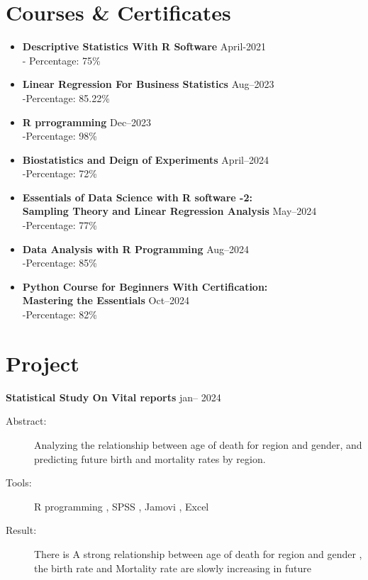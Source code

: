 \documentclass[a4paper,11pt]{article}
\begin{document}
	\section*{Courses \& Certificates}
	\noindent
	\begin{itemize}
		\item \textbf{Descriptive Statistics With R Software } \hfill April-2021\\
		- Percentage: 75\%
		\item \textbf{Linear Regression For Business Statistics} \hfill Aug--2023\\
		-Percentage: 85.22\%
		\item \textbf{R prrogramming } \hfill Dec--2023\\
		-Percentage: 98\%
		\item \textbf{Biostatistics and Deign of Experiments} \hfill April--2024 \\
		-Percentage: 72\%
		\item \textbf{Essentials of Data Science with R software -2:\\
			Sampling Theory and Linear Regression Analysis} \hfill May--2024 \\
			-Percentage: 77\%
		\item \textbf{Data Analysis with R Programming} \hfill Aug--2024 \\
		-Percentage: 85\%
		\item \textbf{Python Course for Beginners With Certification:\\ Mastering the Essentials} \hfill Oct--2024 \\
		-Percentage: 82\%
		
	\end{itemize}
	
	\section*{Project}
	\noindent
	\textbf{Statistical Study On Vital reports} \hfill jan-- 2024 \\
	\begin{description}
		\item[Abstract:] Analyzing the relationship between age of death for region and gender, and predicting future birth and mortality rates by region.
		\item[Tools:] R programming , SPSS , Jamovi , Excel
		\item[Result:] There is A strong relationship between age of death for region and gender , the birth rate and Mortality rate are slowly increasing in future
	\end{description}
\end{document}

